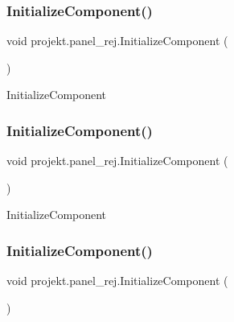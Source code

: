 \subsubsection{\texorpdfstring{Initialize\+Component()}{InitializeComponent()}\hspace{0.1cm}{\footnotesize\ttfamily [4/9]}}
{\footnotesize\ttfamily void projekt.\+panel\+\_\+rej.\+Initialize\+Component (\begin{DoxyParamCaption}{ }\end{DoxyParamCaption})\hspace{0.3cm}{\ttfamily [inline]}}



Initialize\+Component 

\mbox{\label{classprojekt_1_1panel__rej_a603f590d84827e1d551b3f781d6c1f28}} 
\subsubsection{\texorpdfstring{Initialize\+Component()}{InitializeComponent()}\hspace{0.1cm}{\footnotesize\ttfamily [5/9]}}
{\footnotesize\ttfamily void projekt.\+panel\+\_\+rej.\+Initialize\+Component (\begin{DoxyParamCaption}{ }\end{DoxyParamCaption})\hspace{0.3cm}{\ttfamily [inline]}}



Initialize\+Component 

\mbox{\label{classprojekt_1_1panel__rej_a603f590d84827e1d551b3f781d6c1f28}} 
\subsubsection{\texorpdfstring{Initialize\+Component()}{InitializeComponent()}\hspace{0.1cm}{\footnotesize\ttfamily [6/9]}}
{\footnotesize\ttfamily void projekt.\+panel\+\_\+rej.\+Initialize\+Component (\begin{DoxyParamCaption}{ }\end{DoxyParamCaption})\hspace{0.3cm}{\ttfamily [inline]}}



